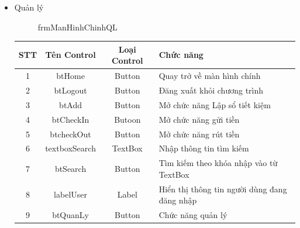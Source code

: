 \documentclass{article}
\begin{document}
\begin{enumerate}
\begin{itemize}
					\newpage
					
					\item Quản lý
					
					\begin{figure}[!h]
						\setlength\fboxsep{1pt}
						\setlength\fboxrule{1pt}
						\caption{frmManHinhChinhQL}
						\label{fig:frmManHinhChinhQL}
					\end{figure}
					
					\begin{tabular}{|c|c|c| p{5cm}|}
						
						\hline
						STT & Tên Control & Loại Control & Chức năng \\
						\hline
						1 & btHome & Button & Quay trở về màn hình chính\\
						\hline
						2 & btLogout & Button & Đăng xuất khỏi chương trình \\
						\hline
						3 & btAdd & Button & Mở chức năng Lập sổ tiết kiệm \\
						\hline
						4 & btCheckIn & Butoon & Mở chức năng gửi tiền \\
						\hline
						5 & btcheckOut & Button & Mở chức năng rút tiền \\
						\hline
						6 & textboxSearch & TextBox & Nhập thông tin tìm kiếm \\
						\hline
						7 & btSearch & Button & Tìm kiếm theo khóa nhập vào từ TextBox\\
						\hline
						8 & labelUser & Label & Hiển thị thông tin người dùng đang đăng nhập\\
						\hline
						9 & btQuanLy & Button & Chức năng quản lý\\
						\hline
					\end{tabular}
					

\end{itemize}
\end{enumerate}
\end{document}
